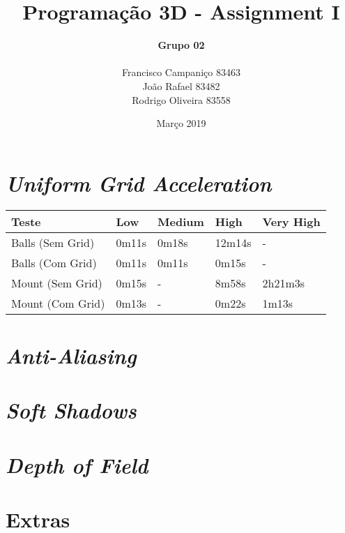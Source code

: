 \documentclass{article}
\title{
    \textbf{Programação 3D - Assignment I}
    }
\author{
    \begin{Large}
        \textbf{Grupo 02}
    \end{Large}\\
    Francisco Campaniço 83463\\
    João Rafael 83482\\
    Rodrigo Oliveira 83558
}
\date{Março 2019}
\begin{document}
    \maketitle

    \section*{\textit{Uniform Grid Acceleration}}
        \par
        \begin{table}[h]
            \centering
            \begin{tabular}{|l|l|l|l|l|}
                \hline
                Teste & Low     & Medium    & High     & Very High \\ \hline
                Balls (Sem Grid) & 0m11s   & 0m18s     & 12m14s   & -         \\ \hline
                Balls (Com Grid) & 0m11s   & 0m11s     & 0m15s   & -         \\ \hline
                Mount (Sem Grid) & 0m15s   & -         & 8m58s    & 2h21m3s   \\ \hline
                Mount (Com Grid) & 0m13s   & -         & 0m22s    & 1m13s   \\ \hline
            \end{tabular}
        \end{table}

    \section*{\textit{Anti-Aliasing}}
        \par


    \section*{\textit{Soft Shadows}}
        \par

        
    \section*{\textit{Depth of Field}}
        \par
    \section*{Extras}        
\end{document}
